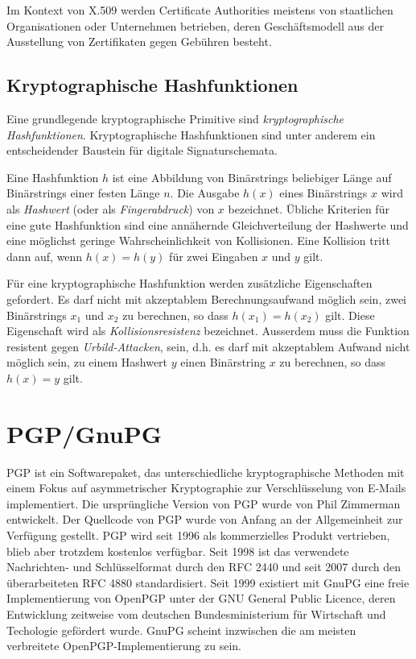 Im Kontext von X.509 werden Certificate Authorities meistens von
staatlichen Organisationen oder Unternehmen betrieben, deren
Gesch\"aftsmodell aus der Ausstellung von Zertifikaten gegen
Geb\"uhren besteht. 

\subsection{Kryptographische Hashfunktionen}
\label{sec:krypt-hashf}

Eine grundlegende kryptographische Primitive sind
\emph{kryptographische Hashfunktionen}. Kryptographische
Hashfunktionen sind unter anderem ein entscheidender Baustein f\"ur
digitale Signaturschemata.

Eine Hashfunktion $h$ ist eine Abbildung von Bin\"arstrings beliebiger
L\"ange auf Bin\"arstrings einer festen L\"ange $n$. Die Ausgabe
$h(x)$ eines Bin\"arstrings $x$ wird als \emph{Hashwert} (oder als
\emph{Fingerabdruck}) von $x$ bezeichnet. \"Ubliche Kriterien f\"ur
eine gute Hashfunktion sind eine ann\"ahernde Gleichverteilung der
Hashwerte und eine m\"oglichst geringe Wahrscheinlichkeit von
Kollisionen. Eine Kollision tritt dann auf, wenn $h(x) = h(y)$ f\"ur
zwei Eingaben $x$ und $y$ gilt.

F\"ur eine kryptographische Hashfunktion werden zus\"atzliche
Eigenschaften gefordert. Es darf nicht mit akzeptablem
Berechnungsaufwand m\"oglich sein, zwei Bin\"arstrings $x_1$ und $x_2$
zu berechnen, so dass $h(x_1) = h(x_2)$ gilt. Diese Eigenschaft wird
als \emph{Kollisionsresistenz} bezeichnet. Ausserdem muss die Funktion
resistent gegen \emph{Urbild-Attacken}, sein, d.h. es darf mit
akzeptablem Aufwand nicht m\"oglich sein, zu einem Hashwert $y$ einen
Bin\"arstring $x$ zu berechnen, so dass $h(x) = y$ gilt.


\section{PGP/GnuPG}
\label{ch:Grundlagen:sec:PGP}

PGP ist ein Softwarepaket, das unterschiedliche kryptographische
Methoden mit einem Fokus auf asymmetrischer Kryptographie zur
Verschl\"usselung von E-Mails implementiert.  Die urspr\"ungliche
Version von PGP wurde von Phil Zimmerman entwickelt. Der Quellcode von
PGP wurde von Anfang an der Allgemeinheit zur Verf\"ugung
gestellt. PGP wird seit 1996 als kommerzielles Produkt vertrieben,
blieb aber trotzdem kostenlos verf\"ugbar\cite{wiki:pgp}. Seit 1998
ist das verwendete Nachrichten- und Schl\"usselformat durch den RFC
2440\cite{Callas1998} und seit 2007 durch den \"uberarbeiteten RFC
4880\cite{Callas2007} standardisiert. Seit 1999 existiert mit
GnuPG\cite{Gnupg2010} eine freie Implementierung von OpenPGP unter der
GNU General Public Licence, deren Entwicklung zeitweise vom deutschen
Bundesministerium f\"ur Wirtschaft und Techologie gef\"ordert
wurde. GnuPG scheint inzwischen die am meisten verbreitete
OpenPGP-Implementierung zu sein.

